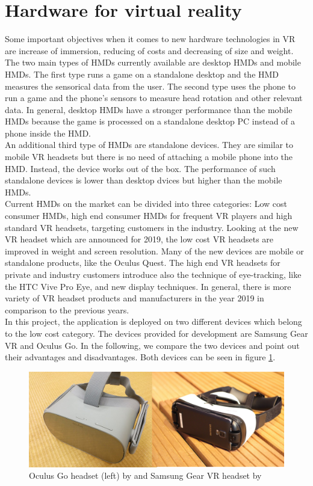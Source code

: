 \section{Hardware for virtual reality} \label{hardware}
Some important objectives when it comes to new hardware technologies in VR are increase of immersion, reducing of costs and decreasing of size and weight. The two main types of HMDs currently available are desktop HMDs and mobile HMDs. The first type runs a game on a standalone desktop and the HMD measures the sensorical data from the user. The second type uses the phone to run a game and the phone's sensors to measure head rotation and other relevant data. In general, desktop HMDs have a stronger performance than the mobile HMDs because the game is processed on a standalone desktop PC instead of a phone inside the HMD. \cite{Dorner.2013}\\
An additional third type of HMDs are standalone devices. They are similar to mobile VR headsets but there is no need of attaching a mobile phone into the HMD. Instead, the device works out of the box. The performance of such standalone devices is lower than desktop dvices but higher than the mobile HMDs. \cite{Vitillo}\\
Current HMDs on the market can be divided into three categories: Low cost consumer HMDs, high end consumer HMDs for frequent VR players and high standard VR headsets, targeting customers in the industry. Looking at the new VR headset which are announced for 2019, the low cost VR headsets are improved in weight and screen resolution. Many of the new devices are mobile or standalone products, like the Oculus Quest. The high end VR headsets for private and industry customers introduce also the technique of eye-tracking, like the HTC Vive Pro Eye, and new display techniques. In general, there is more variety of VR headset products and manufacturers in the year 2019 in comparison to the previous years. \cite{Pertzborn.2019}\\
In this project, the application is deployed on two different devices which belong to the low cost category. The devices provided for development are Samsung Gear VR and Oculus Go. In the following, we compare the two devices and point out their advantages and disadvantages. Both devices can be seen in figure \ref{fig:devices}.

\begin{figure}[h!]
  \includegraphics[width=13cm]{kapitel/oculus-samsung}
  \centering
  \caption{Oculus Go headset (left) by \cite{oculus} and Samsung Gear VR headset by \cite{hmd1}}
  \label{fig:devices}
\end{figure}
\newpage 
